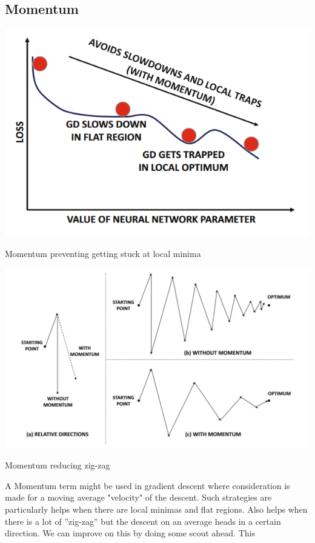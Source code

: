 \subsection{Momentum}
\begin{marginfigure}
    \includegraphics[width=\textwidth]{graphics/momentum.png}
    \caption{Momentum preventing getting stuck at local minima\citep{aggarwal2018neural}}
\end{marginfigure}\begin{marginfigure}
    \includegraphics[width=\textwidth]{graphics/momentum-zigzag.png}
    \caption{Momentum reducing zig-zag\citep{aggarwal2018neural}}
\end{marginfigure}
A Momentum term might be used in gradient descent where consideration is made for a moving
average "velocity"  of the descent. Such strategies are particularly helps when there are local
minimas and flat regions. Also helps when there is a lot of ”zig-zag” but the descent on an
average heads in a certain direction. We can improve on this by doing some scout ahead. This
